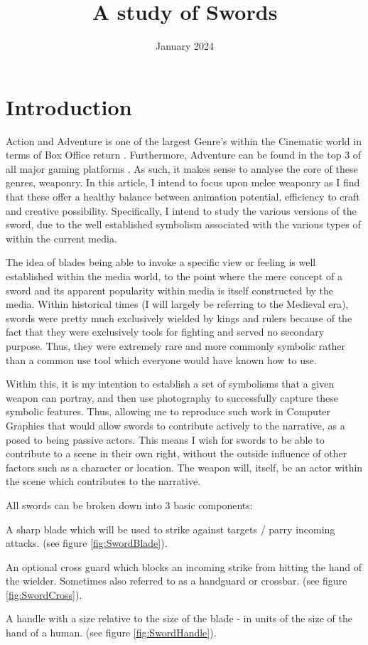 \documentclass{article}
\title{A study of Swords}
\date{January 2024}
\begin{document}
\maketitle

\pagebreak

\tableofcontents

\pagebreak

\section{Introduction} \label{intro}
Action and Adventure is one of the largest Genre's within the Cinematic world in terms of Box Office return \parencite{3}. Furthermore, Adventure can be found in the top 3 of all major gaming platforms \parencite{4}. As such, it makes sense to analyse the core of these genres, weaponry. In this article, I intend to focus upon melee weaponry as I find that these offer a healthy balance between animation potential, efficiency to craft and creative possibility. Specifically, I intend to study the various versions of the sword, due to the well established symbolism associated with the various types of within the current media.

The idea of blades being able to invoke a specific view or feeling is well established within the media world, to the point where the mere concept of a sword and its apparent popularity within media is itself constructed by the media. Within historical times (I will largely be referring to the Medieval era), swords were pretty much exclusively wielded by kings and rulers because of the fact that they were exclusively tools for fighting and served no secondary purpose. Thus, they were extremely rare and more commonly symbolic rather than a common use tool which everyone would have known how to use.

Within this, it is my intention to establish a set of symbolisms that a given weapon can portray, and then use photography to successfully capture these symbolic features. Thus, allowing me to reproduce such work in Computer Graphics that would allow swords to contribute actively to the narrative, as a posed to being passive actors. This means I wish for swords to be able to contribute to a scene in their own right, without the outside influence of other factors such as a character or location. The weapon will, itself, be an actor within the scene which contributes to the narrative.

All swords can be broken down into 3 basic components:
\begin{list}{-}{}
    \item A sharp blade which will be used to strike against targets / parry incoming attacks. (see figure \ref{fig:SwordBlade}).
    \item An optional cross guard which blocks an incoming strike from hitting the hand of the wielder. Sometimes also referred to as a handguard or crossbar. (see figure \ref{fig:SwordCross}).
    \item A handle with a size relative to the size of the blade - in units of the size of the hand of a human. (see figure \ref{fig:SwordHandle}).
\end{list}
\end{document}
